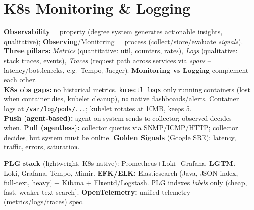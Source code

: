 \renewcommand{\chapcolor}{chMonitor}
\section{K8s Monitoring \& Logging}
\textbf{Observability} = property (degree system generates actionable insights, qualitative); \textbf{Observing}/Monitoring = process (collect/store/evaluate \textit{signals}). \textbf{Three pillars:} \textit{Metrics} (quantitative: util, counters, rates), \textit{Logs} (qualitative: stack traces, events), \textit{Traces} (request path across services via \textit{spans} -- latency/bottlenecks, e.g.\ Tempo, Jaeger). \textbf{Monitoring vs Logging} complement each other. \\
\textbf{K8s obs gaps:} no historical metrics, \texttt{kubectl logs} only running containers (lost when container dies, kubelet cleanup), no native dashboards/alerts. Container logs at \texttt{/var/log/pods/...}; kubelet rotates at 10MB, keeps 5. \\
\textbf{Push (agent-based):} agent on system sends to collector; observed decides when. \textbf{Pull (agentless):} collector queries via SNMP/ICMP/HTTP; collector decides, but system must be online. \textbf{Golden Signals} (Google SRE): latency, traffic, errors, saturation.
\begin{mdframed}
\textbf{PLG stack} (lightweight, K8s-native): Prometheus+Loki+Grafana. \textbf{LGTM:} Loki, Grafana, Tempo, Mimir. \textbf{EFK/ELK:} Elasticsearch (Java, JSON index, full-text, heavy) + Kibana + Fluentd/Logstash. PLG indexes \textit{labels} only (cheap, fast, weaker text search). \textbf{OpenTelemetry:} unified telemetry (metrics/logs/traces) spec.
\end{mdframed}
